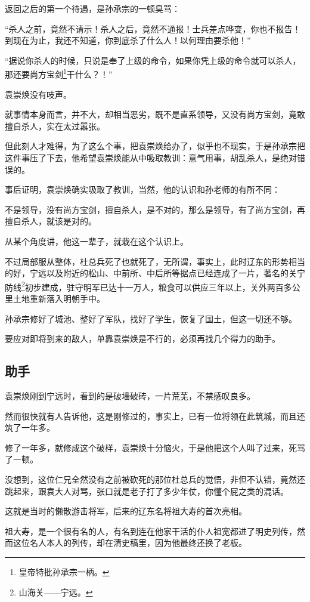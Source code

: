 \begin{multicols}{\theparacolNo}
		返回之后的第一个待遇，是孙承宗的一顿臭骂：

		“杀人之前，竟然不请示！杀人之后，竟然不通报！士兵差点哗变，你也不报告！到现在为止，我还不知道，你到底杀了什么人！以何理由要杀他！”

		“据说你杀人的时候，只说是奉了上级的命令，如果你凭上级的命令就可以杀人，那还要尚方宝剑\footnote{皇帝特批孙承宗一柄。}干什么？！”

		袁崇焕没有吱声。

		就事情本身而言，并不大，却相当恶劣，既不是直系领导，又没有尚方宝剑，竟敢擅自杀人，实在太过嚣张。

		但此刻人才难得，为了这么个事，把袁崇焕给办了，似乎也不现实，于是孙承宗把这件事压了下去，他希望袁崇焕能从中吸取教训：意气用事，胡乱杀人，是绝对错误的。

		事后证明，袁崇焕确实吸取了教训，当然，他的认识和孙老师的有所不同：

		不是领导，没有尚方宝剑，擅自杀人，是不对的，那么是领导，有了尚方宝剑，再擅自杀人，就该是对的。

		从某个角度讲，他这一辈子，就栽在这个认识上。

		不过局部服从整体，杜总兵死了也就死了，无所谓，事实上，此时辽东的形势相当的好，宁远以及附近的松山、中前所、中后所等据点已经连成了一片，著名的关宁防线\footnote{山海关——宁远。}初步建成，驻守明军已达十一万人，粮食可以供应三年以上，关外两百多公里土地重新落入明朝手中。

		孙承宗修好了城池、整好了军队，找好了学生，恢复了国土，但这一切还不够。

		要应对即将到来的敌人，单靠袁崇焕是不行的，必须再找几个得力的助手。

		\subsection{助手}
		袁崇焕刚到宁远时，看到的是破墙破砖，一片荒芜，不禁感叹良多。

		然而很快就有人告诉他，这是刚修过的，事实上，已有一位将领在此筑城，而且还筑了一年多。

		修了一年多，就修成这个破样，袁崇焕十分恼火，于是他把这个人叫了过来，死骂了一顿。

		没想到，这位仁兄全然没有之前被砍死的那位杜总兵的觉悟，非但不认错，竟然还跳起来，跟袁大人对骂，张口就是老子打了多少年仗，你懂个屁之类的混话。

		这就是当时的懒散游击将军，后来的辽东名将祖大寿的首次亮相。

		祖大寿，是一个很有名的人，有名到连在他家干活的仆人祖宽都进了明史列传，然而这位名人本人的列传，却在清史稿里，因为他最终还换了老板。


\end{multicols}

